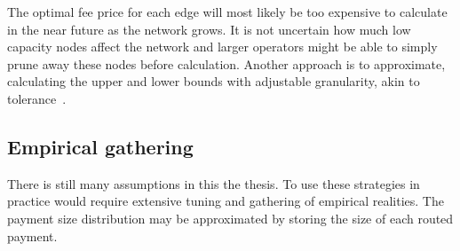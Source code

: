 The optimal fee price for each edge will most likely be too expensive to calculate in the near future as the network grows. It is not uncertain how much low capacity \gls{node}s affect the network and larger operators might be able to simply prune away these nodes before calculation. Another approach is to approximate, calculating the upper and lower bounds with adjustable granularity, akin to tolerance~\cite{goldengorin:jager:tolerance}. 

\subsection{Empirical gathering}

There is still many assumptions in this the thesis. To use these strategies in practice would require extensive tuning and gathering of empirical realities. The payment size distribution may be approximated by storing the size of each routed payment. 


